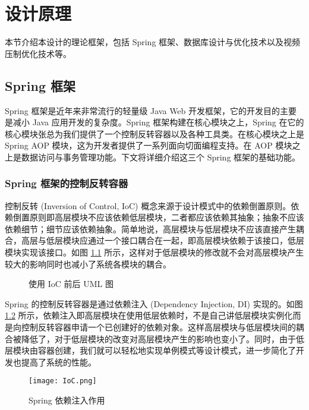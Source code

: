 \chapter{设计原理}\label{sec:theory}

本节介绍本设计的理论框架，包括 Spring 框架、数据库设计与优化技术以及视频压制优化技术等。

\section{Spring 框架}

Spring 框架是近年来非常流行的轻量级 Java Web 开发框架，它的开发目的主要是减小 Java 应用开发的复杂度。Spring 框架构建在核心模块之上，Spring 在它的核心模块张总为我们提供了一个控制反转容器以及各种工具类。在核心模块之上是 Spring AOP 模块，这为开发者提供了一系列面向切面编程支持。在 AOP 模块之上是数据访问与事务管理功能。下文将详细介绍这三个 Spring 框架的基础功能。

\subsection{Spring 框架的控制反转容器}

控制反转 (Inversion of Control, IoC) 概念来源于设计模式中的依赖倒置原则。依赖倒置原则即高层模块不应该依赖低层模块，二者都应该依赖其抽象；抽象不应该依赖细节；细节应该依赖抽象。简单地说，高层模块与低层模块不应该直接产生耦合，高层与低层模块应通过一个接口耦合在一起，即高层模块依赖于该接口，低层模块实现该接口。如图 \ref{fig:beforeAndAfter} 所示，这样对于低层模块的修改就不会对高层模块产生较大的影响同时也减小了系统各模块的耦合。

\begin{figure}[!ht]
\centering
{}\quad
{}
\caption{使用 IoC 前后 UML 图}
\label{fig:beforeAndAfter}
\end{figure}

Spring 的控制反转容器是通过依赖注入 (Dependency Injection, DI) 实现的。如图 \ref{fig:DI} 所示，依赖注入即高层模块在使用低层依赖时，不是自己讲低层模块实例化而是向控制反转容器申请一个已创建好的依赖对象。这样高层模块与低层模块间的耦合被降低了，对于低层模块的改变对高层模块产生的影响也变小了。同时，由于低层模块由容器创建，我们就可以轻松地实现单例模式等设计模式，进一步简化了开发也提高了系统的性能。

\begin{figure}[!ht]
    \centering
    \texttt{[image: IoC.png]}
    \caption{Spring 依赖注入作用}
    \label{fig:DI}
\end{figure}


